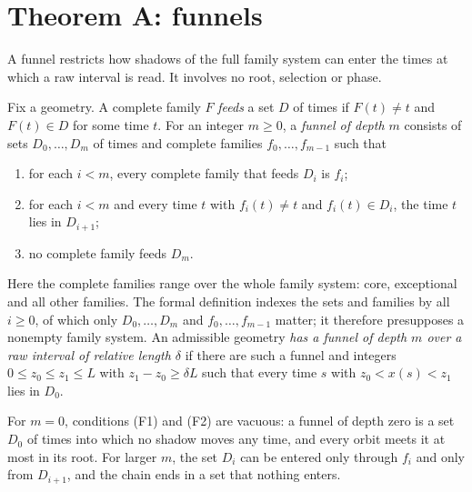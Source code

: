 \section{Theorem A: funnels}\label{sec:funnels}

A funnel restricts how shadows of the full family system can enter the times at which
a raw interval is read. It involves no root, selection or phase.

\begin{definition}\label{def:funnel}
Fix a geometry. A complete family $F$ \emph{feeds} a set $D$ of times if $F(t)\ne t$
and $F(t)\in D$ for some time $t$. For an integer $m\ge0$, a \emph{funnel of depth
$m$} consists of sets $D_0,\dots,D_m$ of times and complete families
$f_0,\dots,f_{m-1}$ such that
\begin{enumerate}[label=(F\arabic*)]
\item for each $i<m$, every complete family that feeds $D_i$ is $f_i$;
\item for each $i<m$ and every time $t$ with $f_i(t)\ne t$ and $f_i(t)\in D_i$, the
time $t$ lies in $D_{i+1}$;
\item no complete family feeds $D_m$.
\end{enumerate}
Here the complete families range over the whole family system: core, exceptional and
all other families. The formal definition indexes the sets and families by all
$i\ge0$, of which only $D_0,\dots,D_m$ and $f_0,\dots,f_{m-1}$ matter; it therefore
presupposes a nonempty family system. An admissible geometry \emph{has a funnel of
depth $m$ over a raw interval of relative length $\delta$} if there are such a funnel
and integers
$0\le z_0\le z_1\le L$ with $z_1-z_0\ge\delta L$ such that every time $s$ with
$z_0<x(s)<z_1$ lies in $D_0$.
\end{definition}

For $m=0$, conditions (F1) and (F2) are vacuous: a funnel of depth zero is a set $D_0$
of times into which no shadow moves any time, and every orbit meets it at most in its
root. For larger $m$, the set $D_i$ can be entered only through $f_i$ and only from
$D_{i+1}$, and the chain ends in a set that nothing enters.

